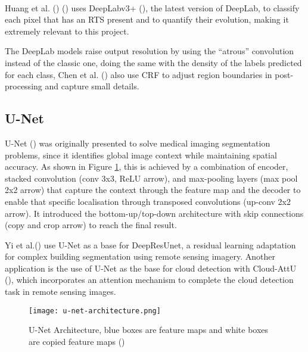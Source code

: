 \paragraph{}
Huang et al. (\cite{HUANG2020111534}) (\cite{HUANG2021102399}) uses DeepLabv3+ (\cite{Chen_2018_ECCV}), the latest version of DeepLab, to classify each pixel that has an \gls{RTS} present and to quantify their evolution, making it extremely relevant to this project.

The DeepLab models raise output resolution by using the “atrous” convolution instead of the classic one, doing the same with the density of the labels predicted for each class, Chen et al. (\cite{chen2017deeplab}) also use \gls{CRF} to adjust region boundaries in post-processing and capture small details.

\subsection{U-Net}
U-Net (\cite{ronneberger2015unet}) was originally presented to solve medical imaging segmentation problems, since it identifies global image context while maintaining spatial accuracy. As shown in Figure \ref{fig_unet}, this is achieved by a combination of encoder, stacked convolution (conv 3x3, \gls{ReLU} arrow), and max-pooling layers (max pool 2x2 arrow) that capture the context through the feature map and the decoder to enable that specific localisation through transposed convolutions (up-conv 2x2 arrow). It introduced the bottom-up/top-down architecture with skip connections (copy and crop arrow) to reach the final result.

Yi et al.(\cite{rs11151774}) use U-Net as a base for DeepResUnet, a residual learning adaptation for complex building segmentation using remote sensing imagery. Another application is the use of U-Net as the base for cloud detection with Cloud-AttU (\cite{sym12061056}), which incorporates an attention mechanism to complete the cloud detection task in remote sensing images.

    \begin{figure}[hbt!]
        \centering
        \texttt{[image: u-net-architecture.png]}
        \caption{U-Net Architecture, blue boxes are feature maps and white boxes are copied feature maps (\cite{ronneberger2015unet})}
        \label{fig_unet}
    \end{figure}